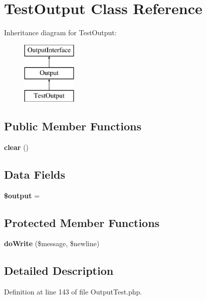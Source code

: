 \section{Test\+Output Class Reference}
\label{class_symfony_1_1_component_1_1_console_1_1_tests_1_1_output_1_1_test_output}
Inheritance diagram for Test\+Output\+:\begin{figure}[H]
\begin{center}
\leavevmode
\includegraphics[height=3.000000cm]{class_symfony_1_1_component_1_1_console_1_1_tests_1_1_output_1_1_test_output}
\end{center}
\end{figure}
\subsection*{Public Member Functions}
\begin{DoxyCompactItemize}
\item 
{\bf clear} ()
\end{DoxyCompactItemize}
\subsection*{Data Fields}
\begin{DoxyCompactItemize}
\item 
{\bf \$output} = \textquotesingle{}\textquotesingle{}
\end{DoxyCompactItemize}
\subsection*{Protected Member Functions}
\begin{DoxyCompactItemize}
\item 
{\bf do\+Write} (\$message, \$newline)
\end{DoxyCompactItemize}


\subsection{Detailed Description}


Definition at line 143 of file Output\+Test.\+php.



